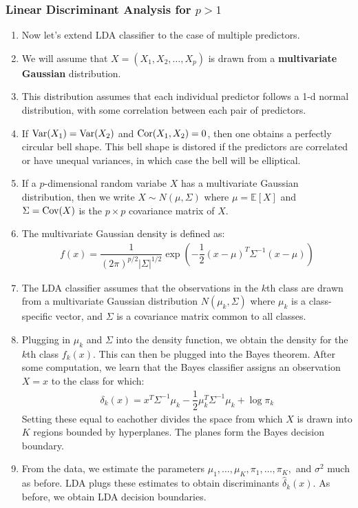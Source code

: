 \documentclass[10pt]{article}
\newcommand{\EE}{{\mathbb{E}}}
\newcommand{\Var}{{\rm Var}}
\newcommand{\Cor}{{\rm Cor}}
\newcommand{\Cov}{{\rm Cov}}
\begin{document}
\subsubsection{Linear Discriminant Analysis for $p > 1$}
\begin{enumerate}
	\item Now let's extend LDA classifier to the case of multiple predictors.
	\item We will assume that $X = (X_1, X_2, \dots, X_p)$ is drawn from a \textbf{multivariate Gaussian} distribution.
	\item This distribution assumes that each individual predictor follows a 1-d normal distribution, with some correlation between each pair of predictors.  
	\item If $\Var(X_1) = \Var(X_2)$ and $\Cor(X_1, X_2) = 0$, then one obtains a perfectly circular bell shape.  This bell shape is distored if the predictors are correlated or have unequal variances, in which case the bell will be elliptical.
	\item If a $p$-dimensional random variabe $X$ has a multivariate Gaussian distribution, then we write $X \sim N(\mu, \Sigma)$ where $\mu = \EE[X]$ and $\Sigma = \Cov(X)$ is the $p \times p$ covariance matrix of $X$. 
	\item The multivariate Gaussian density is defined as:
	\begin{align*}
		f(x) = \dfrac{1}{(2\pi)^{p/2} | \Sigma |^{1/2}} \exp \left( -\dfrac{1}{2}(x - \mu)^T \Sigma^{-1} (x - \mu) \right) 
	\end{align*}
	\item The LDA classifier assumes that the observations in the $k$th class are drawn from a multivariate Gaussian distribution $N(\mu_k, \Sigma)$ where $\mu_k$ is a class-specific vector, and $\Sigma$ is a covariance matrix common to all classes.  
	\item Plugging in $\mu_k$ and $\Sigma$ into the density function, we obtain the density for the $k$th class $f_k(x)$.  This can then be plugged into the Bayes theorem.  After some computation, we learn that the Bayes classifier assigns an observation $X = x$ to the class for which:
	\begin{align*}
		\delta_k(x) = x^{T} \Sigma^{-1} \mu_k - \dfrac{1}{2} \mu_k^T \Sigma^{-1} \mu_k + \log \pi_k 
	\end{align*}
	Setting these equal to eachother divides the space from which $X$ is drawn into $K$ regions bounded by hyperplanes.  The planes form the Bayes decision boundary.
	\item From the data, we estimate the parameters $\mu_1, \dots, \mu_K, \pi_1, \dots, \pi_K,$ and $\sigma^2$ much as before.  LDA plugs these estimates to obtain discriminants $\hat \delta_k(x)$.  As before, we obtain LDA decision boundaries.

\end{enumerate}
\end{document}
